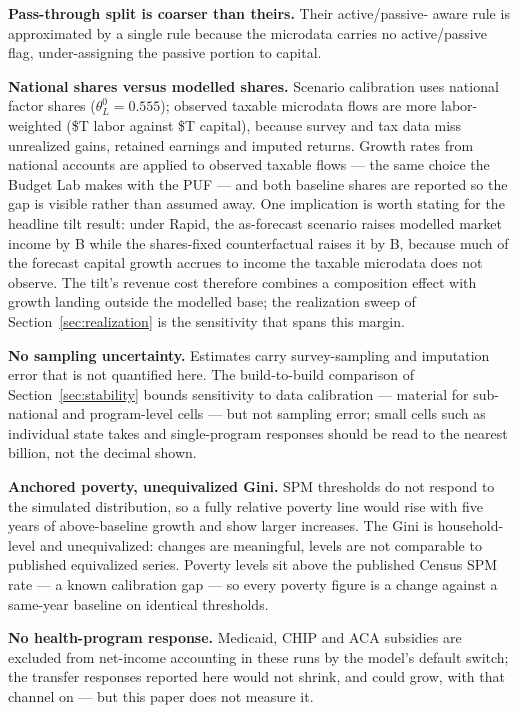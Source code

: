 \textbf{Pass-through split is coarser than theirs.} Their active/passive-%
aware rule is approximated by a single rule because the microdata carries no
active/passive flag, under-assigning the passive portion to capital.

\textbf{National shares versus modelled shares.} Scenario calibration uses
national factor shares ($\theta^0_L = 0.555$); observed taxable microdata
flows are more labor-weighted (\$\genModelledLaborShareT T labor against
\$\genModelledCapitalShareT T capital), because survey and tax data miss
unrealized gains, retained earnings and imputed returns. Growth rates from
national accounts are applied to observed taxable flows --- the same choice
the Budget Lab makes with the PUF --- and both baseline shares are reported
so the gap is visible rather than assumed away. One implication is worth
stating for the headline tilt result: under Rapid, the as-forecast scenario
raises modelled market income by \genRapidPropMarketDelta B while the
shares-fixed counterfactual raises it by \genRapidFixedMarketDelta B,
because much of the forecast capital growth accrues to income the taxable
microdata does not observe. The tilt's revenue cost therefore combines a
composition effect with growth landing outside the modelled base; the
realization sweep of Section~\ref{sec:realization} is the sensitivity that
spans this margin.

\textbf{No sampling uncertainty.} Estimates carry survey-sampling and
imputation error that is not quantified here. The build-to-build comparison
of Section~\ref{sec:stability} bounds sensitivity to data calibration ---
material for sub-national and program-level cells --- but not sampling
error; small cells such as individual state takes and single-program
responses should be read to the nearest billion, not the decimal shown.

\textbf{Anchored poverty, unequivalized Gini.} SPM thresholds do not respond
to the simulated distribution, so a fully relative poverty line would rise
with five years of above-baseline growth and show larger increases. The
Gini is household-level and unequivalized: changes are meaningful, levels
are not comparable to published equivalized series. Poverty levels sit above
the published Census SPM rate \citep{census2025} --- a known calibration gap
--- so every poverty figure is a change against a same-year baseline on
identical thresholds.

\textbf{No health-program response.} Medicaid, CHIP and ACA subsidies are
excluded from net-income accounting in these runs by the model's default
switch; the transfer responses reported here would not shrink, and could
grow, with that channel on --- but this paper does not measure it.

